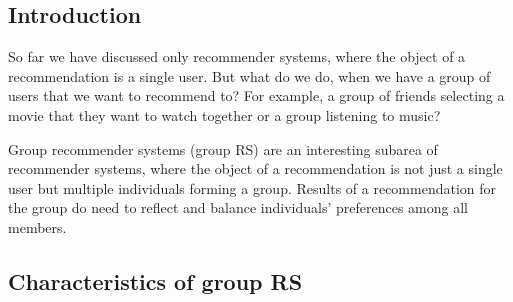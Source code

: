 \subsection{Introduction}\label{subsec:01_group_rec_sys.introduction}
So far we have discussed only recommender systems, where the object of a recommendation is a single user. But what do we do, when we have a group of users that we want to recommend to? For example, a group of friends selecting a movie that they want to watch together or a group listening to music? %

Group recommender systems (group RS) are an interesting subarea of recommender systems, where the object of a recommendation is not just a single user but multiple individuals forming a group. Results of a recommendation for the group do need to reflect and balance individuals' preferences among all members.


\subsection{Characteristics of group RS}




